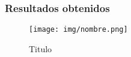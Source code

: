 \subsubsection*{Resultados obtenidos}

\begin{figure}[H]
	\centering	\texttt{[image: img/nombre.png]}
	\caption{Titulo}
	\label{fig:etiqueta}
\end{figure}


